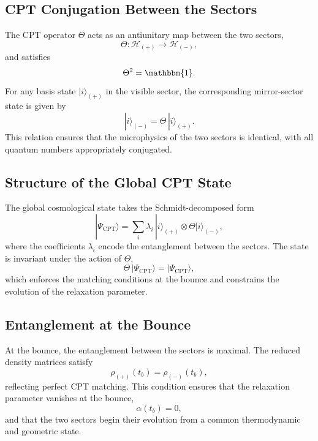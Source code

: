 \documentclass[11pt,a4paper]{article}
\begin{document}
\subsection{CPT Conjugation Between the Sectors}

The CPT operator $\Theta$ acts as an antiunitary map between the two sectors,
\begin{equation}
    \Theta: \mathcal{H}_{(+)} \longrightarrow \mathcal{H}_{(-)},
\end{equation}
and satisfies
\begin{equation}
    \Theta^2 = \mathbbm{1}.
\end{equation}
For any basis state $|i\rangle_{(+)}$ in the visible sector, the corresponding mirror-sector state is given by
\begin{equation}
    |i\rangle_{(-)} = \Theta\,|i\rangle_{(+)}.
\end{equation}
This relation ensures that the microphysics of the two sectors is identical, with all quantum numbers appropriately conjugated.

\subsection{Structure of the Global CPT State}

The global cosmological state takes the Schmidt-decomposed form
\begin{equation}
    |\Psi_{\mathrm{CPT}}\rangle = \sum_i \lambda_i\,|i\rangle_{(+)} \otimes \Theta|i\rangle_{(-)},
\end{equation}
where the coefficients $\lambda_i$ encode the entanglement between the sectors. The state is invariant under the action of $\Theta$,
\begin{equation}
    \Theta\,|\Psi_{\mathrm{CPT}}\rangle = |\Psi_{\mathrm{CPT}}\rangle,
\end{equation}
which enforces the matching conditions at the bounce and constrains the evolution of the relaxation parameter.

\subsection{Entanglement at the Bounce}

At the bounce, the entanglement between the sectors is maximal. The reduced density matrices satisfy
\begin{equation}
    \rho_{(+)}(t_b) = \rho_{(-)}(t_b),
\end{equation}
reflecting perfect CPT matching. This condition ensures that the relaxation parameter vanishes at the bounce,
\begin{equation}
    \alpha(t_b) = 0,
\end{equation}
and that the two sectors begin their evolution from a common thermodynamic and geometric state.
\end{document}
